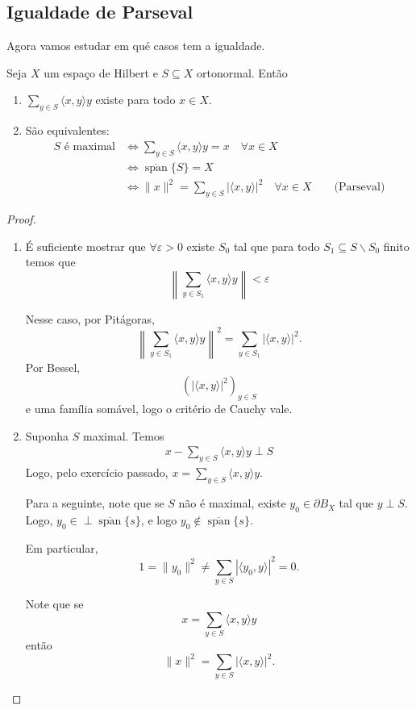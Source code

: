 \documentclass[portuguese]{article}
\theoremstyle{definition}
\begin{document}
\subsection{Igualdade de Parseval}
Agora vamos estudar em qué casos tem a igualdade.
\begin{teo}
	Seja $X$ um espaço de Hilbert e $S\subseteq X$ ortonormal. Então
	\begin{enumerate}
		\item $\sum_{y\in S}\langle x,y\rangle y$ existe para todo $x\in X$.
		\item São equivalentes:
		\begin{align*}
			S\text{ é maximal}&\iff \sum_{y\in S}\langle x,y\rangle y=x\quad\forall x\in X\\
			&\iff\overline{\operatorname{span}}\{S\}=X\\
			&\iff\|x\|^2=\sum_{y\in S}|\langle x,y\rangle|^2\quad\forall x\in X\qquad\text{(Parseval)}
		\end{align*}
	\end{enumerate}
\end{teo}
\begin{proof}\leavevmode
	\begin{enumerate}
		\item \begin{exer*}
		É suficiente mostrar que $\forall\varepsilon>0$ existe $S_0$ tal que para todo $S_1\subseteq S\backslash S_0$ finito temos que
		\[\left\|\sum_{y\in S_1}\langle x,y\rangle y\right\|<\varepsilon\]
	\end{exer*}
	Nesse caso, por Pitágoras,
	\[\left\|\sum_{y\in S_1}\langle x,y\rangle y\right\|^2=\sum_{y\in S_1}|\langle x,y\rangle|^2.\]
	Por Bessel,
	\[(|\langle x,y\rangle|^2)_{y\in S}\]
	e uma família somável, logo o critério de Cauchy vale.
	\item Suponha $S$ maximal. Temos 
	\begin{align*}
		x-\sum_{y\in S}\langle x,y\rangle y\perp S
	\end{align*}
	Logo, pelo exercício passado, $x=\sum_{y\in S}\langle x,y\rangle y$.
	
	Para a seguinte, note que se $S$ não é maximal, existe $y_0\in\partial B_X$ tal que $y\perp S$. Logo, $y_0\in \perp\overline{\operatorname{span}}\{s\}$, e logo $y_0\notin\overline{\operatorname{span}}\{s\}$.
	
	Em particular, 
	\[1=\|y_0\|^2\neq\sum_{y\in S}|\langle y_0,y\rangle|^2=0.\]
	
	Note que se
	\[x=\sum_{y\in S}\langle x,y\rangle y\]
	então 
	\[\|x\|^2=\sum_{y\in S}|\langle x,y\rangle|^2.\]
	\end{enumerate}
\end{proof}
\end{document}
